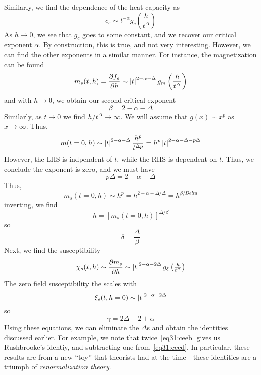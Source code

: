 Similarly, we find the dependence of the heat capacity as
\begin{equation}
	c_s\sim t^{-\alpha}g_c\left(\frac{h}{t^\Delta}\right)\label{eq31:ceea}
\end{equation}
As \(h\to 0\), we see that \(g_c\) goes to some constant, and we recover our critical exponent \(\alpha\). By construction, this is true, and not very interesting. However, we can find the other exponents in a similar manner. For instance, the magnetization can be found
\begin{equation}
	m_s(t,h) = \frac{\partial f_s}{\partial h}\sim\left|t\right|^{2-\alpha-\Delta}g_m\left(\frac{h}{t^\Delta}\right)
\end{equation}
and with \(h\to 0\), we obtain our second critical exponent
\begin{equation}
	\beta = 2-\alpha - \Delta \label{eq31:ceeb}
\end{equation}
Similarly, as \(t\to 0\) we find \(h/t^\Delta\to\infty\). We will assume that \(g(x)\sim x^p\) as \(x\to \infty\). Thus,
\[m(t=0,h)\sim \left|t\right|^{2-\alpha-\Delta}\frac{h^p}{t^{\Delta p}} = h^p\left|t\right|^{2-\alpha-\Delta-p\Delta}\]
However, the LHS is indpendent of \(t\), while the RHS is dependent on \(t\). Thus, we conclude the exponent is zero, and we must have
\begin{equation}
	p\Delta = 2-\alpha-\Delta \label{eq31:ceep}
\end{equation}
Thus,
\[m_s(t=0,h) \sim h^p = h^{2-\alpha-\Delta/\Delta} = h^{\beta/Delta}\]
inverting, we find
\[h = [m_s(t=0,h)]^{\Delta/\beta}\]
so
\begin{equation}
	\delta = \frac{\Delta}{\beta}\label{eq31:ceed}
\end{equation}
Next, we find the susceptibility
\[\chi_s(t,h) \sim \frac{\partial m_s}{\partial h}\sim \left|t\right|^{2-\alpha-2\Delta}g_\xi\left(\tfrac{h}{t^\Delta}\right)\]
The zero field susceptibility the scales with
\[\xi_s(t, h=0)\sim \left|t\right|^{2-\alpha-2\Delta}\]
so
\begin{equation}
	\gamma = 2\Delta - 2+\alpha \label{eq31:ceec}
\end{equation}
Using these equations, we can eliminate the \(\Delta\)s and obtain the identities discussed earlier. For example, we note that twice~\ref{eq31:ceeb} gives us Rushbrooke's identiy, and subtracting one from~\ref{eq31:ceed}. In particular, these results are from a new ``toy'' that theorists had at the time---these identities are a triumph of \emph{renormalization theory}.

